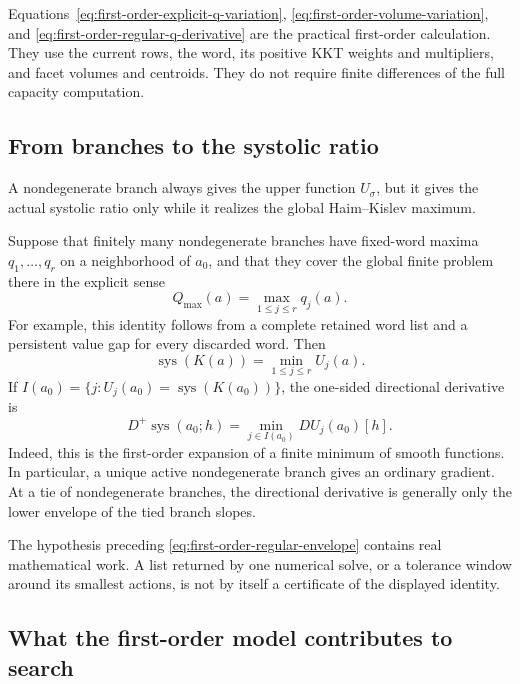 Equations~\eqref{eq:first-order-explicit-q-variation},
\eqref{eq:first-order-volume-variation}, and
\eqref{eq:first-order-regular-q-derivative} are the practical first-order
calculation.  They use the current rows, the word, its positive KKT weights and
multipliers, and facet volumes and centroids.  They do not require finite
differences of the full capacity computation.

\subsection{From branches to the systolic ratio}
\label{subsec:first-order-branch-envelope}

A nondegenerate branch always gives the upper function \(U_\sigma\), but it gives the
actual systolic ratio only while it realizes the global Haim--Kislev maximum.

Suppose that finitely many nondegenerate branches have fixed-word maxima
\(q_1,\ldots,q_r\) on a neighborhood of \(a_0\), and that they cover the
global finite problem there in the explicit sense
\[
  Q_{\max}(a)=\max_{1\leq j\leq r}q_j(a).
\]
For example, this identity follows from a complete retained word list and a
persistent value gap for every discarded word.  Then
\begin{equation}\label{eq:first-order-regular-envelope}
  \operatorname{sys}(K(a))=\min_{1\leq j\leq r}U_j(a).
\end{equation}
If \(I(a_0)=\{j:U_j(a_0)=\operatorname{sys}(K(a_0))\}\), the one-sided
directional derivative is
\begin{equation}\label{eq:first-order-envelope-derivative}
  D^+\operatorname{sys}(a_0;h)
  =\min_{j\in I(a_0)}DU_j(a_0)[h].
\end{equation}
Indeed, this is the first-order expansion of a finite minimum of smooth
functions.  In particular, a unique active nondegenerate branch gives an ordinary
gradient.  At a tie of nondegenerate branches, the directional derivative is generally only the
lower envelope of the tied branch slopes.

The hypothesis preceding \eqref{eq:first-order-regular-envelope} contains real
mathematical work.  A list returned by one numerical solve, or a tolerance
window around its smallest actions, is not by itself a certificate of the
displayed identity.

\subsection{What the first-order model contributes to search}
\label{subsec:first-order-search-model}

